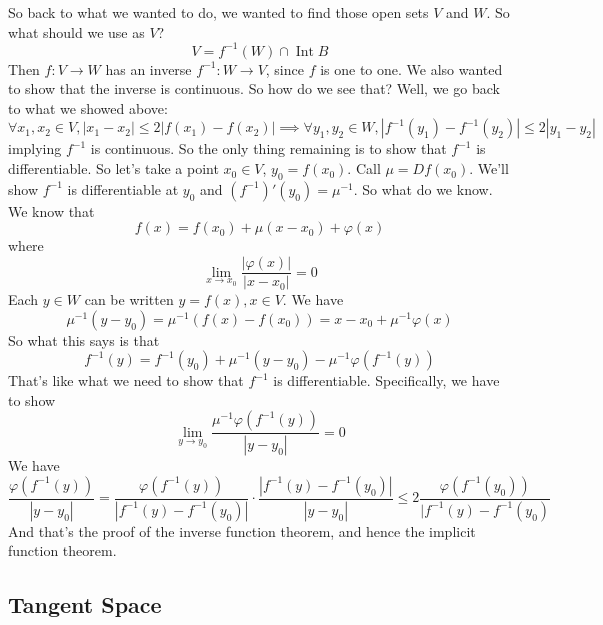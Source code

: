 \documentclass{article}
\DeclareMathOperator{\Int}{Int}
\begin{document}
So back to what we wanted to do, we wanted to find those open sets \(V\) and \(W\). So what should we use as \(V\)?
\[V = f^{-1}(W) \cap \Int B\]
Then \(f: V \to W\) has an inverse \(f^{-1}: W \to V\), since \(f\) is one to one. We also wanted to show that the inverse is continuous. So how do we see that? Well, we go back to what we showed above:
\[\forall x_1, x_2 \in V, |x_1 - x_2| \leq 2|f(x_1) - f(x_2)| \implies \forall y_1, y_2 \in W, |f^{-1}(y_1) - f^{-1}(y_2)| \leq 2|y_1 - y_2|\]
implying \(f^{-1}\) is continuous. So the only thing remaining is to show that \(f^{-1}\) is differentiable. So let's take a point \(x_0 \in V\), \(y_0 = f(x_0)\). Call \(\mu = Df(x_0)\). We'll show \(f^{-1}\) is differentiable at \(y_0\) and \((f^{-1})'(y_0) = \mu^{-1}\). So what do we know. We know that
\[f(x) = f(x_0) + \mu(x - x_0) + \varphi(x)\]
where
\[\lim_{x \to x_0}\frac{|\varphi(x)|}{|x - x_0|} = 0\]
Each \(y \in W\) can be written \(y = f(x), x \in V\). We have
\[\mu^{-1}(y - y_0) = \mu^{-1}(f(x) - f(x_0)) = x - x_0 + \mu^{-1}\varphi(x)\]
So what this says is that
\[f^{-1}(y) = f^{-1}(y_0) + \mu^{-1}(y - y_0) - \mu^{-1}\varphi(f^{-1}(y))\]
That's like what we need to show that \(f^{-1}\) is differentiable. Specifically, we have to show
\[\lim_{y \to y_0}\frac{\mu^{-1}\varphi(f^{-1}(y))}{|y - y_0|} = 0\]
We have
\[\frac{\varphi(f^{-1}(y))}{|y - y_0|} = \frac{\varphi(f^{-1}(y))}{|f^{-1}(y) - f^{-1}(y_0)|} \cdot \frac{|f^{-1}(y) - f^{-1}(y_0)|}{|y - y_0|} \leq 2\frac{\varphi(f^{-1}(y_0))}{|f^{-1}(y) - f^{-1}(y_0)}\]
And that's the proof of the inverse function theorem, and hence the implicit function theorem.


\subsection{Tangent Space}
\end{document}
